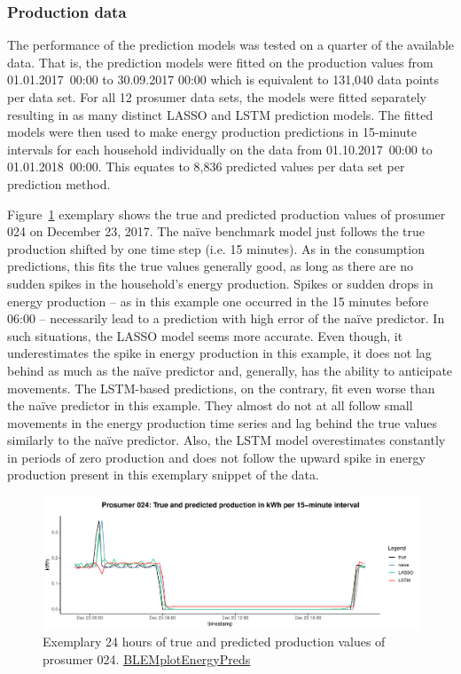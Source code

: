 \subsubsection{Production data}

The performance of the prediction models was tested on a quarter of the available data. That is, the prediction models were fitted on the production values from 01.01.2017~00:00 to 30.09.2017 00:00 which is equivalent to 131,040 data points per data set. For all 12 prosumer data sets, the models were fitted separately resulting in as many distinct LASSO and LSTM prediction models. The fitted models were then used to make energy production predictions in 15-minute intervals for each household individually on the data from 01.10.2017~00:00 to 01.01.2018~00:00. This equates to 8,836 predicted values per data set per prediction method.

Figure~\ref{Fig:glimpse_predprod} exemplary shows the true and predicted production values of prosumer 024 on December 23, 2017. The na\"ive benchmark model just follows the true production shifted by one time step (i.e. 15 minutes). As in the consumption predictions, this fits the true values generally good, as long as there are no sudden spikes in the household's energy production. Spikes or sudden drops in energy production -- as in this example one occurred in the 15 minutes before 06:00 -- necessarily lead to a prediction with high error of the na\"ive predictor. In such situations, the LASSO model seems more accurate. Even though, it underestimates the spike in energy production in this example, it does not lag behind as much as the na\"ive predictor and, generally, has the ability to anticipate movements. The LSTM-based predictions, on the contrary, fit even worse than the na\"ive predictor in this example. They almost do not at all follow small movements in the energy production time series and lag behind the true values similarly to the na\"ive predictor. Also, the LSTM model overestimates constantly in periods of zero production and does not follow the upward spike in energy production present in this exemplary snippet of the data.
%
\begin{figure}[htbp]
    \centering
    \includegraphics[width=\textwidth]{thesis/graphs/evaluation/p024_pred_prod.pdf}
    \caption[Exemplary 24 hours of true and predicted production values]{Exemplary 24 hours of true and predicted production values of prosumer 024. \quantnet\href{https://github.com/QuantLet/BLEM/tree/master/BLEMplotEnergyPreds}{BLEMplotEnergyPreds}}
    \label{Fig:glimpse_predprod}
\end{figure}
%

